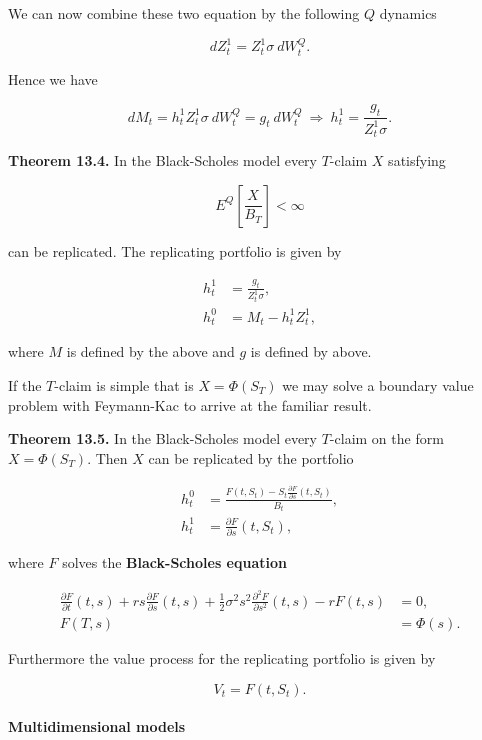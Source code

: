 \documentclass[
]{article}
\begin{document}
We can now combine these two equation by the following \(Q\) dynamics

\[
dZ_t^1=Z_t^1\sigma\ dW_t^Q.
\]

Hence we have

\[
dM_t=h_t^1Z_t^1\sigma\ dW_t^Q=g_t\ dW_t^Q\ \Rightarrow\ h_t^1=\frac{g_t}{Z_t^1\sigma}.
\]

\textbf{Theorem 13.4.} In the Black-Scholes model every \(T\)-claim
\(X\) satisfying

\[
E^Q\left[\frac{X}{B_T}\right]<\infty
\]

can be replicated. The replicating portfolio is given by

\begin{align*}
h_t^1&=\frac{g_t}{Z_t^1\sigma},\\
h_t^0&=M_t-h_t^1Z_t^1,
\end{align*}

where \(M\) is defined by the above and \(g\) is defined by above.

If the \(T\)-claim is simple that is \(X=\Phi(S_T)\) we may solve a
boundary value problem with Feymann-Kac to arrive at the familiar
result.

\textbf{Theorem 13.5.} In the Black-Scholes model every \(T\)-claim on
the form \(X=\Phi(S_T)\). Then \(X\) can be replicated by the portfolio

\begin{align*}
h_t^0&=\frac{F(t,S_t)-S_t\frac{\partial F}{\partial s}(t,S_t)}{B_t},\\
h_t^1&=\frac{\partial F}{\partial s}(t,S_t),
\end{align*}

where \(F\) solves the \textbf{Black-Scholes equation}

\begin{align*}
\frac{\partial F}{\partial t}(t,s)+rs\frac{\partial F}{\partial s}(t,s)+\frac{1}{2}\sigma^2s^2 \frac{\partial^2 F}{\partial s^2}(t,s)-rF(t,s)&=0,\\
F(T,s)&=\Phi(s).
\end{align*}

Furthermore the value process for the replicating portfolio is given by

\[
V_t=F(t,S_t).
\]

\hypertarget{multidimensional-models}{%
\paragraph{Multidimensional models}\label{multidimensional-models}}
\end{document}
